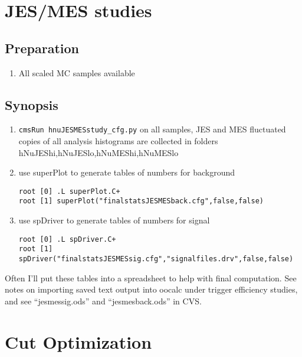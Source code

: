 \documentclass[english]{article}
\begin{document}
\section{JES/MES studies}

\subsection{Preparation}
%
\begin{enumerate}
\item All scaled MC samples available
\end{enumerate}

\subsection{Synopsis}
%
\begin{enumerate}
%
\item \verb#cmsRun hnuJESMESstudy_cfg.py# on all samples,
JES and MES fluctuated copies of all analysis histograms are
collected in folders hNuJEShi,hNuJESlo,hNuMEShi,hNuMESlo
%
\item use superPlot to generate tables of numbers for background
%
\begin{lstlisting}
root [0] .L superPlot.C+
root [1] superPlot("finalstatsJESMESback.cfg",false,false)
\end{lstlisting}
%
\item use spDriver to generate tables of numbers for signal
%
\begin{lstlisting}
root [0] .L spDriver.C+
root [1] spDriver("finalstatsJESMESsig.cfg","signalfiles.drv",false,false)
\end{lstlisting}
%
\end{enumerate}

Often I'll put these tables into a spreadsheet to help with final
computation. See notes on importing saved text output into oocalc under
trigger efficiency studies, and see ``jesmessig.ods'' and ``jesmesback.ods''
in CVS.

\section{Cut Optimization}
\end{document}
